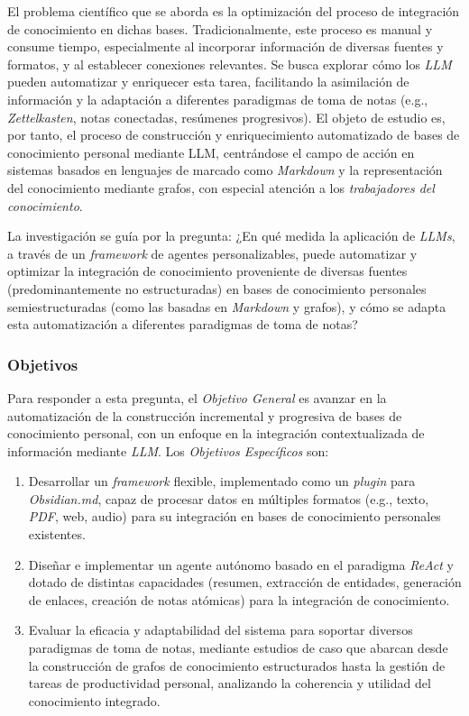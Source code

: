 El problema científico que se aborda es la optimización del proceso de integración de conocimiento en dichas bases. Tradicionalmente, este proceso es manual y consume tiempo, especialmente al incorporar información de diversas fuentes y formatos, y al establecer conexiones relevantes. Se busca explorar cómo los \textit{LLM} pueden automatizar y enriquecer esta tarea, facilitando la asimilación de información y la adaptación a diferentes paradigmas de toma de notas (e.g., \textit{Zettelkasten}, notas conectadas, resúmenes progresivos). El objeto de estudio es, por tanto, el proceso de construcción y enriquecimiento automatizado de bases de conocimiento personal mediante LLM, centrándose el campo de acción en sistemas basados en lenguajes de marcado como \textit{Markdown} y la representación del conocimiento mediante grafos, con especial atención a los \textit{trabajadores del conocimiento}.

La investigación se guía por la pregunta: ¿En qué medida la aplicación de \textit{LLMs}, a través de un \textit{framework} de agentes personalizables, puede automatizar y optimizar la integración de conocimiento proveniente de diversas fuentes (predominantemente no estructuradas) en bases de conocimiento personales semiestructuradas (como las basadas en \textit{Markdown} y grafos), y cómo se adapta esta automatización a diferentes paradigmas de toma de notas?

\subsubsection{Objetivos}
\label{sec:objetivos}
Para responder a esta pregunta, el \textit{Objetivo General} es avanzar en la automatización de la construcción incremental y progresiva de bases de conocimiento personal, con un enfoque en la integración contextualizada de información mediante \textit{LLM}. Los \textit{Objetivos Específicos} son:
\begin{enumerate}
    \item Desarrollar un \textit{framework} flexible, implementado como un \textit{plugin} para \textit{Obsidian.md}, capaz de procesar datos en múltiples formatos (e.g., texto, \textit{PDF}, web, audio) para su integración en bases de conocimiento personales existentes.
    \item Diseñar e implementar un agente autónomo basado en el paradigma \textit{ReAct} y dotado de distintas capacidades (resumen, extracción de entidades, generación de enlaces, creación de notas atómicas) para la integración de conocimiento.
    \item Evaluar la eficacia y adaptabilidad del sistema para soportar diversos paradigmas de toma de notas, mediante estudios de caso que abarcan desde la construcción de grafos de conocimiento estructurados hasta la gestión de tareas de productividad personal, analizando la coherencia y utilidad del conocimiento integrado.
\end{enumerate}

